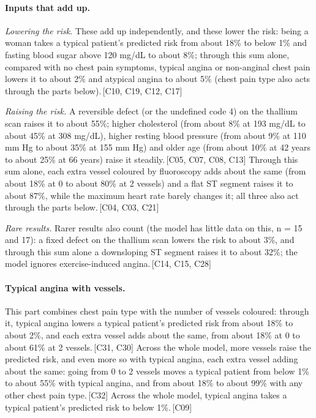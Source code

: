 \documentclass[a4paper,10pt]{article}
\newif\ifreviewmarks
\newcommand{\reviewrule}{\noindent{\color{BrickRed}\rule{\linewidth}{0.8pt}}}
\newenvironment{drafted}[1][]{%
  \ifreviewmarks\par\addvspace{\medskipamount}\reviewrule\par\nopagebreak
  \noindent{\color{BrickRed}\sffamily\footnotesize\textbf{Thesis Draft}\quad #1\hfill review}\par\nopagebreak\smallskip\fi}{%
  \ifreviewmarks\par\smallskip\noindent{\color{BrickRed}\sffamily\footnotesize end of thesis draft}\par\nopagebreak\reviewrule\par\medskip\fi}
\begin{document}
\begin{drafted}[plain-language layer: heart-s1-c1]
\paragraph{Inputs that add up.} \par\noindent\textit{Lowering the risk.}  These add up independently, and these lower the risk: being a woman takes a typical patient's predicted risk from about 18\% to below 1\% and fasting blood sugar above 120 mg/dL to about 8\%; through this sum alone, compared with no chest pain symptoms, typical angina or non-anginal chest pain lowers it to about 2\% and atypical angina to about 5\% (chest pain type also acts through the parts below).\,{\scriptsize\textcolor{NavyBlue}{[C10, C19, C12, C17]}} \par\noindent\textit{Raising the risk.}  A reversible defect (or the undefined code 4) on the thallium scan raises it to about 55\%; higher cholesterol (from about 8\% at 193 mg/dL to about 45\% at 308 mg/dL), higher resting blood pressure (from about 9\% at 110 mm Hg to about 35\% at 155 mm Hg) and older age (from about 10\% at 42 years to about 25\% at 66 years) raise it steadily.\,{\scriptsize\textcolor{NavyBlue}{[C05, C07, C08, C13]}} Through this sum alone, each extra vessel coloured by fluoroscopy adds about the same (from about 18\% at 0 to about 80\% at 2 vessels) and a flat ST segment raises it to about 87\%, while the maximum heart rate barely changes it; all three also act through the parts below.\,{\scriptsize\textcolor{NavyBlue}{[C04, C03, C21]}} \par\noindent\textit{Rare results.}  Rarer results also count (the model has little data on this, n = 15 and 17): a fixed defect on the thallium scan lowers the risk to about 3\%, and through this sum alone a downsloping ST segment raises it to about 32\%; the model ignores exercise-induced angina.\,{\scriptsize\textcolor{NavyBlue}{[C14, C15, C28]}}
\paragraph{Typical angina with vessels.} This part combines chest pain type with the number of vessels coloured: through it, typical angina lowers a typical patient's predicted risk from about 18\% to about 2\%, and each extra vessel adds about the same, from about 18\% at 0 to about 61\% at 2 vessels.\,{\scriptsize\textcolor{NavyBlue}{[C31, C30]}} Across the whole model, more vessels raise the predicted risk, and even more so with typical angina, each extra vessel adding about the same: going from 0 to 2 vessels moves a typical patient from below 1\% to about 55\% with typical angina, and from about 18\% to about 99\% with any other chest pain type.\,{\scriptsize\textcolor{NavyBlue}{[C32]}} Across the whole model, typical angina takes a typical patient's predicted risk to below 1\%.\,{\scriptsize\textcolor{NavyBlue}{[C09]}}

\end{drafted}
\end{document}
